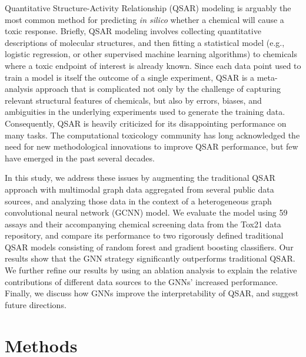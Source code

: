 \documentclass{ws-procs11x85}
\begin{document}
Quantitative Structure-Activity Relationship (QSAR) modeling is arguably the most common method for predicting \textit{in silico} whether a chemical will cause a toxic response.
Briefly, QSAR modeling involves collecting quantitative descriptions of molecular structures, and then fitting a statistical model (e.g., logistic regression, or other supervised machine learning algorithms) to chemicals where a toxic endpoint of interest is already known.
Since each data point used to train a model is itself the outcome of a single experiment, QSAR is a meta-analysis approach that is complicated not only by the challenge of capturing relevant structural features of chemicals, but also by errors, biases, and ambiguities in the underlying experiments used to generate the training data.
Consequently, QSAR is heavily criticized for its disappointing performance on many tasks.
The computational toxicology community has long acknowledged the need for new methodological innovations to improve QSAR performance, but few have emerged in the past several decades.

In this study, we address these issues by augmenting the traditional QSAR approach with multimodal graph data aggregated from several public data sources, and analyzing those data in the context of a heterogeneous graph convolutional neural network (GCNN) model.
We evaluate the model using 59 assays and their accompanying chemical screening data from the Tox21 data repository, and compare its performance to two rigorously defined traditional QSAR models consisting of random forest and gradient boosting classifiers.
Our results show that the GNN strategy significantly outperforms traditional QSAR.
We further refine our results by using an ablation analysis to explain the relative contributions of different data sources to the GNNs' increased performance.
Finally, we discuss how GNNs improve the interpretability of QSAR, and suggest future directions.


\section{Methods}
\end{document}
